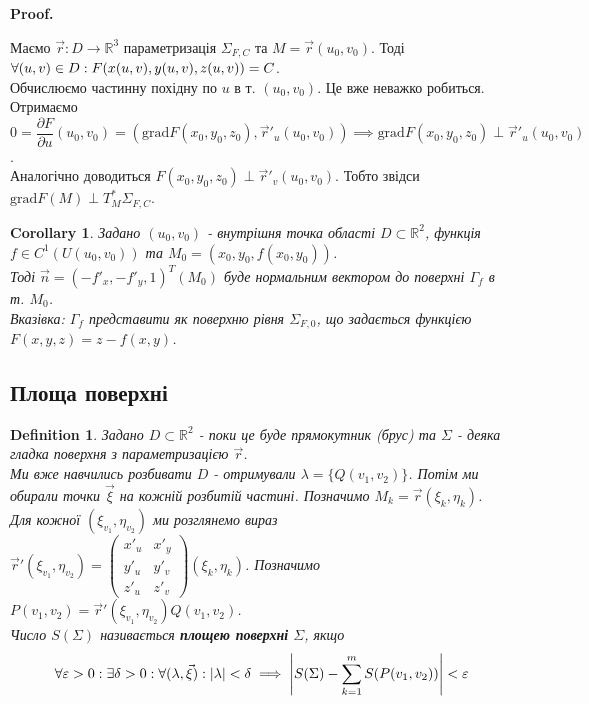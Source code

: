 \documentclass[a4paper, 10pt]{article}
\makeatletter
\def\departial#1#2{\dfrac{\partial {#1}}{\partial {#2}}}
\def\qed{$\blacksquare$}
\theoremstyle{theoremdd}
\theoremstyle{theoremdd}
\newtheorem{definition}[theorem]{Definition}
\theoremstyle{theoremdd}
\theoremstyle{theoremdd}
\theoremstyle{theoremdd}
\theoremstyle{theoremdd}
\theoremstyle{theoremdd}
\theoremstyle{theoremdd}
\newtheorem{corollary}[theorem]{Corollary}
\renewenvironment{proof}[1][Proof.\\]{\par
\pushQED{\hfill \qed}%
\normalfont \topsep6\p@\@plus6\p@\relax
\trivlist
\item\relax
{\bfseries
#1\@addpunct{.}}\hspace\labelsep\ignorespaces
}{%
\popQED\endtrivlist\@endpefalse
}
\makeatother
\begin{document}
\begin{proof}
Маємо $\vec{r}: D \to \mathbb{R}^3$ параметризація $\Sigma_{F,C}$ та $M = \vec{r}(u_0,v_0)$. Тоді $\forall (u,v) \in D:\\ F(x(u,v), y(u,v), z(u,v)) = C$.\\
Обчислюємо частинну похідну по $u$ в т. $(u_0,v_0)$. Це вже неважко робиться. Отримаємо $0 = \departial{F}{u}(u_0,v_0) = \left( \text{grad} F(x_0,y_0,z_0), \vec{r}'_u(u_0,v_0) \right) \implies \text{grad} F(x_0,y_0,z_0) \perp \vec{r}'_u(u_0,v_0)$.\\
Аналогічно доводиться $F(x_0,y_0,z_0) \perp \vec{r}'_v(u_0,v_0)$. Тобто звідси $\text{grad} F(M) \perp T_M^* \Sigma_{F,C}$.
\end{proof}

\begin{corollary}
Задано $(u_0,v_0)$ - внутрішня точка області $D \subset \mathbb{R}^2$, функція $f \in C^1(U(u_0,v_0))$ та $M_0 = (x_0,y_0,f(x_0,y_0))$.\\
Тоді $\vec{n} = (-f'_x, -f'_y, 1)^T(M_0)$ буде нормальним вектором до поверхні $\Gamma_f$ в т. $M_0$.\\
\textit{Вказівка: $\Gamma_f$ представити як поверхню рівня $\Sigma_{F,0}$, що задається функцією $F(x,y,z) = z - f(x,y)$. }
\end{corollary}

\subsection{Площа поверхні}
\begin{definition}
Задано $D \subset \mathbb{R}^2$ - поки це буде прямокутник (брус) та $\Sigma$ - деяка гладка поверхня з параметризацією $\vec{r}$.\\
Ми вже навчились розбивати $D$ - отримували $\lambda = \{Q(v_1,v_2)\}$. Потім ми обирали точки $\vec{\xi}$ на кожній розбитій частині. Позначимо $M_k = \vec{r}(\xi_k,\eta_k)$.\\
Для кожної $(\xi_{v_1},\eta_{v_2})$ ми розглянемо вираз $\vec{r}'(\xi_{v_1},\eta_{v_2}) = \begin{pmatrix}
x'_u & x'_y \\
y'_u & y'_v \\
z'_u & z'_v
\end{pmatrix} (\xi_k, \eta_k)$. Позначимо $P(v_1,v_2) = \vec{r}'(\xi_{v_1},\eta_{v_2}) Q(v_1,v_2)$.\\
Число  $S(\Sigma)$ називається \textbf{площею поверхні} $\Sigma$, якщо
\begin{align*}
\forall \varepsilon > 0: \exists \delta > 0: \forall (\lambda,\vec{\xi}): |\lambda| < \delta \implies \abs{S(\Sigma) - \sum_{k=1}^m S(P(v_1,v_2))} < \varepsilon
\end{align*}
\end{definition}
\end{document}
